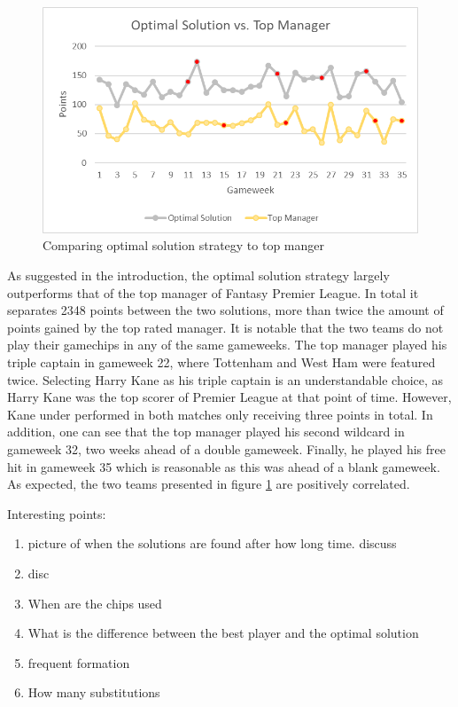 \begin{figure}[H]
\label{fig:Top_Manager}
    \centering
    \includegraphics[scale=1.00]{fig/chapter_7/Top_manager.png}
    \caption{Comparing optimal solution strategy to top manger}
\label{Top_Manager}    
\end{figure}

As suggested in the introduction, the optimal solution strategy largely outperforms that of the top manager of Fantasy Premier League. In total it separates 2348 points between the two solutions, more than twice the amount of points gained by the top rated manager. It is notable that the two teams do not play their gamechips in any of the same gameweeks. The top manager played his triple captain in gameweek 22, where Tottenham and West Ham were featured twice. Selecting Harry Kane as his triple captain is an understandable choice, as Harry Kane was the top scorer of Premier League at that point of time. However, Kane under performed in both matches only receiving three points in total. In addition, one can see that the top manager played his second wildcard in gameweek 32, two weeks ahead of a double gameweek. Finally, he played his free hit in gameweek 35 which is reasonable as this was ahead of a blank gameweek. As expected, the two teams presented in figure \ref{Top_Manager} are positively correlated.   
 
Interesting points:
\begin{enumerate}
    \item picture of when the solutions are found after how long time. discuss 
    \item disc
    \item When are the chips used
    \item What is the difference between the best player and the optimal solution
    \item frequent formation
    \item How many substitutions
\end{enumerate}


